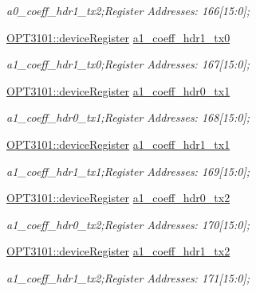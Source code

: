 \begin{DoxyCompactItemize}
\begin{DoxyCompactList}\small\item\em a0\+\_\+coeff\+\_\+hdr1\+\_\+tx2;Register Addresses\+: 166\mbox{[}15\+:0\mbox{]}; \end{DoxyCompactList}\item 
\mbox{\hyperlink{class_o_p_t3101_1_1device_register}{O\+P\+T3101\+::device\+Register}} \mbox{\hyperlink{class_o_p_t3101_1_1registers_a5a9b90a370d47f3d9b2ab598ab31033c}{a1\+\_\+coeff\+\_\+hdr1\+\_\+tx0}}
\begin{DoxyCompactList}\small\item\em a1\+\_\+coeff\+\_\+hdr1\+\_\+tx0;Register Addresses\+: 167\mbox{[}15\+:0\mbox{]}; \end{DoxyCompactList}\item 
\mbox{\hyperlink{class_o_p_t3101_1_1device_register}{O\+P\+T3101\+::device\+Register}} \mbox{\hyperlink{class_o_p_t3101_1_1registers_af52c791e2ec0d9c47fbeb0b5f60eded2}{a1\+\_\+coeff\+\_\+hdr0\+\_\+tx1}}
\begin{DoxyCompactList}\small\item\em a1\+\_\+coeff\+\_\+hdr0\+\_\+tx1;Register Addresses\+: 168\mbox{[}15\+:0\mbox{]}; \end{DoxyCompactList}\item 
\mbox{\hyperlink{class_o_p_t3101_1_1device_register}{O\+P\+T3101\+::device\+Register}} \mbox{\hyperlink{class_o_p_t3101_1_1registers_aa9c09eefe2e5a2a493ec8ff446e7b4de}{a1\+\_\+coeff\+\_\+hdr1\+\_\+tx1}}
\begin{DoxyCompactList}\small\item\em a1\+\_\+coeff\+\_\+hdr1\+\_\+tx1;Register Addresses\+: 169\mbox{[}15\+:0\mbox{]}; \end{DoxyCompactList}\item 
\mbox{\hyperlink{class_o_p_t3101_1_1device_register}{O\+P\+T3101\+::device\+Register}} \mbox{\hyperlink{class_o_p_t3101_1_1registers_a28620ff58d7654e8c337405c8adca382}{a1\+\_\+coeff\+\_\+hdr0\+\_\+tx2}}
\begin{DoxyCompactList}\small\item\em a1\+\_\+coeff\+\_\+hdr0\+\_\+tx2;Register Addresses\+: 170\mbox{[}15\+:0\mbox{]}; \end{DoxyCompactList}\item 
\mbox{\hyperlink{class_o_p_t3101_1_1device_register}{O\+P\+T3101\+::device\+Register}} \mbox{\hyperlink{class_o_p_t3101_1_1registers_a76eac6ba3b74c0d12ad8f586cc35d3cf}{a1\+\_\+coeff\+\_\+hdr1\+\_\+tx2}}
\begin{DoxyCompactList}\small\item\em a1\+\_\+coeff\+\_\+hdr1\+\_\+tx2;Register Addresses\+: 171\mbox{[}15\+:0\mbox{]}; \end{DoxyCompactList}\item 

\end{DoxyCompactItemize}
